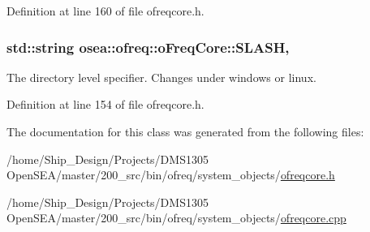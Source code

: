Definition at line 160 of file ofreqcore.\-h.

\hypertarget{classosea_1_1ofreq_1_1o_freq_core_ad7a03236bc96443ec94efa89e86db816}{
\subsubsection[{S\-L\-A\-S\-H}]{\setlength{\rightskip}{0pt plus 5cm}std\-::string osea\-::ofreq\-::o\-Freq\-Core\-::\-S\-L\-A\-S\-H\hspace{0.3cm}{\ttfamily [static]}, {\ttfamily [protected]}}}\label{classosea_1_1ofreq_1_1o_freq_core_ad7a03236bc96443ec94efa89e86db816}
The directory level specifier. Changes under windows or linux. 

Definition at line 154 of file ofreqcore.\-h.



The documentation for this class was generated from the following files\-:\begin{DoxyCompactItemize}
\item 
/home/\-Ship\-\_\-\-Design/\-Projects/\-D\-M\-S1305 Open\-S\-E\-A/master/200\-\_\-src/bin/ofreq/system\-\_\-objects/\hyperlink{ofreqcore_8h}{ofreqcore.\-h}\item 
/home/\-Ship\-\_\-\-Design/\-Projects/\-D\-M\-S1305 Open\-S\-E\-A/master/200\-\_\-src/bin/ofreq/system\-\_\-objects/\hyperlink{ofreqcore_8cpp}{ofreqcore.\-cpp}\end{DoxyCompactItemize}
